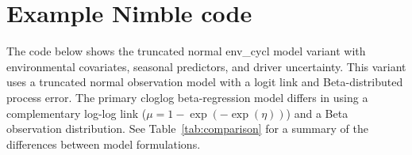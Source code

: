 \documentclass[11pt]{article}
\begin{document}
\section{Example Nimble code}

The code below shows the truncated normal env\_cycl model variant with environmental covariates, seasonal predictors, and driver uncertainty. This variant uses a truncated normal observation model with a logit link and Beta-distributed process error. The primary cloglog beta-regression model differs in using a complementary log-log link ($\mu = 1 - \exp(-\exp(\eta))$) and a Beta observation distribution. See Table~\ref{tab:comparison} for a summary of the differences between model formulations.
\end{document}
